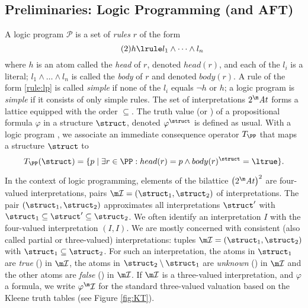 \subsection{Preliminaries: Logic Programming (and AFT)}
\renewcommand\voc\atoms
A logic program $\mathcal{P}$ is a set of \emph{rules} $r$ of the form 
\begin{equation}
 \tag{2}h\lrule l_1\land \dots \land l_n \label{rule:lp}
\end{equation}
where
$h$ is an atom called the \emph{head} of $r$, denoted $head(r)$, and each of the $l_i$ is a literal; $ l_1\land \dots \land l_n$ is called  the \emph{body} of $r$ and denoted $body(r)$.
A rule of the form \eqref{rule:lp} is called \emph{simple} if none of the $l_i$ equals $\lnot h$ or $h$; a logic program is \emph{simple} if it consists of only simple rules.
The set of interpretations $2^\voc$ forms a lattice equipped with the order $\subseteq$. 
The truth value (\ltrue or \lfalse) of a propositional formula $\varphi$ in a structure $\struct$, denoted $\varphi^\struct$ is defined as usual.
With a logic program \PP, we associate an immediate consequence operator \cite{jacm/EmdenK76} $T_\PP$ that maps a structure $\struct$ to 
	\[T_\PP(\struct) = \{p\mid \exists r \in \PP: head(r)=p\land body(r)^\struct=\ltrue\}.\] 
	
	
	In the context of logic programming, elements of the bilattice $\left(2^\voc\right)^2$ are four-valued interpretations, pairs $\pstruct= (\struct_1,\struct_2)$ of interpretations.
The pair $(\struct_1,\struct_2)$ approximates all interpretations $\struct'$ with $\struct_1\subseteq \struct'\subseteq \struct_2$.
We often identify an interpretation $I$ with the four-valued interpretation $(I,I)$.
We are mostly concerned with consistent (also called partial or three-valued) interpretations: tuples $\pstruct=(\struct_1,\struct_2)$ with $\struct_1\subseteq\struct_2$. 
For such an interpretation, the atoms in $\struct_1$ are \emph{true} (\ltrue) in $\pstruct$, the atoms in $\struct_2\setminus\struct_1$ are \emph{unknown} (\lunkn) in $\pstruct$ and the other atoms are \emph{false} (\lfalse) in $\pstruct$. 
If $\pstruct$ is a three-valued interpretation, and $\varphi$ a formula, we write $\varphi^\pstruct$ for the standard three-valued valuation based on the Kleene truth tables (see Figure \ref{fig:KT}). 




